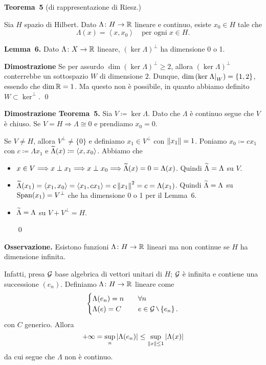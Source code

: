 \hypertarget{thm:lez2728ott-teo3}{%
\textbf{Teorema~5} (di rappresentazione di Riesz.)} Sia $H$ spazio di Hilbert. Dato $\Lambda \colon  H \to \mathbb R$ lineare e continuo, esiste $x_0 \in H$ tale che 
\begin{equation} \tag{$\ast$}
	\Lambda(x) = \left<x,x_0 \right> \quad \text{per ogni} \; x \in H.
\end{equation}

\textbf{Lemma~6.} Dato $\Lambda \colon X \to \mathbb R$ lineare, $\left( \ker \Lambda \right)^\perp$ ha dimensione 0 o 1.

\textbf{Dimostrazione} Se per assurdo $\dim (\ker \Lambda)^\perp \geq 2$, allora $(\ker \Lambda)^\perp$ conterrebbe un sottospazio $W$ di dimensione $2$.
Dunque, $\operatorname{dim} \left( \ker \left.\Lambda\right|_{W} \right) = \{1,2\}$, essendo che $\operatorname{dim} \mathbb R = 1$. Ma questo non è possibile, in quanto abbiamo definito $W \subset \ker^\perp$. 
\qed

\textbf{Dimostrazione Teorema~5.}
Sia $V \coloneqq \ker \Lambda$. Dato che $\Lambda$ è continuo segue che $V$ è chiuso.
Se $V = H \Longrightarrow \Lambda \cong 0$ e prendiamo $x_0 = 0$.

Se $V \neq H$, allora $V^\perp \neq \{0\}$ e definiamo $x_1 \in V^\perp$ con $\left\lVert x_1 \right\rVert = 1$.
Poniamo $x_0 \coloneqq  c x_1$ con $c \coloneqq  \Lambda x_1$ e $\widetilde{\Lambda}(x) \coloneqq \left<x,x_0 \right>$. Abbiamo che
\begin{itemize}

	\item $x \in V \Longrightarrow x \perp x_1 \Longrightarrow x \perp x_0 \Longrightarrow \widetilde{\Lambda}(x) = 0 = \Lambda(x)$. Quindi $\widetilde{\Lambda} = \Lambda$ su $V$.

	\item $\widetilde{\Lambda}(x_1) = \left<x_1,x_0 \right> = \left<x_1, c x_1 \right> = c \left\lVert x_1 \right\rVert^2 = c = \Lambda(x_1)$. Quindi $\widetilde{\Lambda} = \Lambda$ su $\operatorname{Span}(x_1) = V^\perp$ che ha dimensione 0 o 1 per il Lemma~6.

	\item $\widetilde{\Lambda} = \Lambda$ su $V + V^\perp = H$.

\qed
\end{itemize}

\textbf{Osservazione.}
Esistono funzioni $\Lambda \colon  H \to \mathbb R$ lineari ma non continue se $H$ ha dimensione infinita. 

Infatti, presa $\mathcal{G}$ base algebrica di vettori unitari di $H$; $\mathcal{G}$ è infinita e contiene una successione $(e_n)$. Definiamo $\Lambda \colon H \to \mathbb R$ lineare come
%
$$
	\begin{cases}
	\Lambda(e_n) = n & \quad \forall n \\
	\Lambda(e) = C & \quad  e \in \mc{G} \setminus \left\{ e_n \right\}.
	\end{cases} 
$$
con $C$ generico. Allora
%
$$
	+\infty = \sup_n \left| \Lambda(e_n) \right| \leq \sup_{\left\lVert x \right\rVert \leq 1} \left| \Lambda(x) \right| 
$$
%
da cui segue che $\Lambda$ non è continuo.


